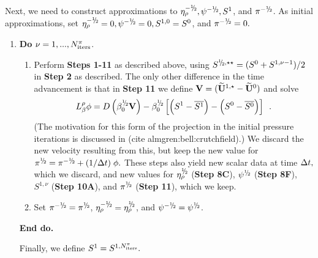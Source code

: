 Next, we need to construct approximations to $\etarho^{-\myhalf}, \psi^{-\myhalf}, S^1$,
and $\pi^{-\myhalf}$.  As initial approximations, set 
$\etarho^{-\myhalf}=0, \psi^{-\myhalf}=0, S^{1,0}=S^0$, and $\pi^{-\myhalf}=0.$
\begin{enumerate}
\renewcommand{\theenumi}{{\bf \alph{enumi}}}
\renewcommand{\labelenumii}{\roman{enumii}.}
\addtocounter{enumi}{1}
\item {\bf Do} {$\nu = 1,...,N_{\rm iters}^{\pi}$.}
  \begin{enumerate}
  \item Perform {\bf Steps 1-11} as described above, using 
    $S^{\myhalf,\star\star} = (S^0 + S^{1,\nu-1})/2$ in {\bf Step 2} as described.
    The only other difference in the time advancement is that in {\bf Step 11}
    we define ${\bf V} = (\widetilde{{\bf U}}^{1,\star} - \widetilde{{\bf U}}^0)$ and solve
    \begin{equation}  L_\beta^\rho \phi = D \left ( \beta_0^{\myhalf} {\bf V} \right) - \beta_0^{\myhalf} \left[ \left(S^{1}-\overline{S^{1}}\right) - \left(S^{0}-\overline{S^{0}}\right) \right] \enskip . 
    \end{equation}
    (The motivation for this form of the projection in the initial pressure iterations
    is discussed in (cite almgren:bell:crutchfield).)
      We discard the new velocity resulting from this, but keep the new  
      value for $\pi^{\myhalf} = \pi^{-\myhalf} + (1 / \dt) \; \phi.$  
      These steps also yield new scalar data at time $\Delta t,$ which
      we discard, and new values for $\etarho^{\myhalf}$ ({\bf Step 8C}), 
      $\psi^{\myhalf}$ ({\bf Step 8F}), 
      $S^{1,\nu}$ ({\bf Step 10A}), and $\pi^{\myhalf}$ ({\bf Step 11}), which we keep.
    \item Set $\pi^{-\myhalf} = \pi^{\myhalf}$, $\etarho^{-\myhalf} = \etarho^{\myhalf}$,
      and $\psi^{-\myhalf} = \psi^{\myhalf}$. 
    \end{enumerate}
    
    {\bf End do.}
    
    Finally, we define $S^1 = S^{1,N_{\rm iters}^\pi}.$
    
  \end{enumerate}
